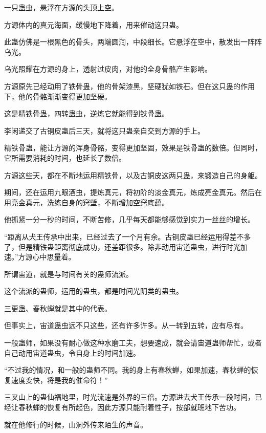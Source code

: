 
\begin{this_body}

一只蛊虫，悬浮在方源的头顶上空。

方源体内的真元海面，缓慢地下降着，用来催动这只蛊。

此蛊仿佛是一根黑色的骨头，两端圆润，中段细长。它悬浮在空中，散发出一阵阵乌光。

乌光照耀在方源的身上，透射过皮肉，对他的全身骨骼产生影响。

方源原先已经动用了铁骨蛊，他的骨架漆黑，坚硬犹如铁石。但在这只蛊的作用下，他的骨骼渐渐变得更加坚硬。

这是精铁骨蛊，四转蛊虫，逆炼它就能得到铁骨蛊。

李闲递交了古铜皮蛊后三天，就将这只蛊亲自交到方源的手上。

精铁骨蛊，能让方源的浑身骨骼，变得更加坚固，效果是铁骨蛊的数倍。但同时，它所需要消耗的时间，也延长了数倍。

方源这些天，都在不断地运用精铁骨，以及古铜皮这两只蛊，来锻造自己的身躯。

期间，还在运用九眼酒虫，提炼真元，将初阶的淡金真元，炼成亮金真元。然后在用亮金真元，洗练自身的窍壁，不断增加空窍底蕴。

他抓紧一分一秒的时间，不断苦修，几乎每天都能够感觉到实力一丝丝的增长。

“距离从犬王传承中出来，已经过去了一个月有余。古铜皮蛊已经运用得差不多了，但是精铁蛊距离彻底成功，还差距很多。除非动用宙道蛊虫，进行时光加速。”方源心中思量着。

所谓宙道，就是与时间有关的蛊师流派。

这个流派的蛊师，运用的蛊虫，都是时间光阴类的蛊虫。

三更蛊、春秋蝉就是其中的代表。

但事实上，宙道蛊虫远不只这些，还有许多许多。从一转到五转，应有尽有。

一般蛊师，如果没有耐心做这种水磨工夫，想要速成，就会请宙道蛊师帮忙，或者自己动用宙道蛊虫，令自身上的时间加速。

“不过我的情况，和一般的蛊师不同。我的身上有春秋蝉，如果加速，春秋蝉的恢复速度变快，将是我的催命符！”

三叉山上的蛊仙福地里，时光流速是外界的三倍。方源进去犬王传承一段时间，已经让春秋蝉的恢复有所起色，因此方源只能耐着性子，按部就班地下苦功。

就在他修行的时候，山洞外传来陌生的声音。


\end{this_body}
